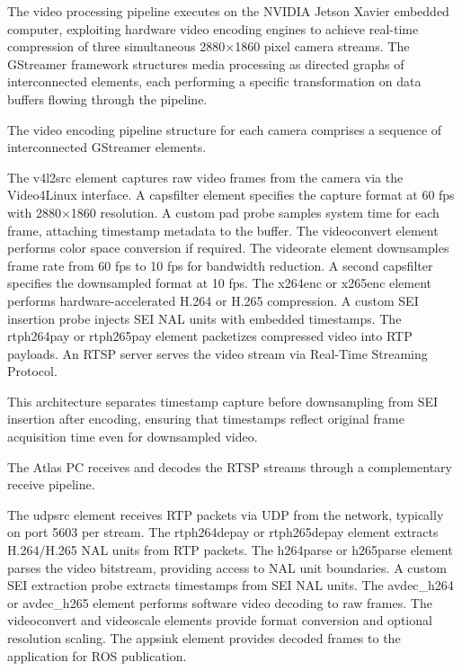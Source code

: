 \documentclass{erauthesis}
\begin{document}

The video processing pipeline executes on the NVIDIA Jetson Xavier embedded computer, exploiting hardware video encoding engines to achieve real-time compression of three simultaneous 2880×1860 pixel camera streams.
The GStreamer framework structures media processing as directed graphs of interconnected elements, each performing a specific transformation on data buffers flowing through the pipeline.


The video encoding pipeline structure for each camera comprises a sequence of interconnected GStreamer elements.

The v4l2src element captures raw video frames from the camera via the Video4Linux interface.
A capsfilter element specifies the capture format at 60 fps with 2880×1860 resolution.
A custom pad probe samples system time for each frame, attaching timestamp metadata to the buffer.
The videoconvert element performs color space conversion if required.
The videorate element downsamples frame rate from 60 fps to 10 fps for bandwidth reduction.
A second capsfilter specifies the downsampled format at 10 fps.
The x264enc or x265enc element performs hardware-accelerated H.264 or H.265 compression.
A custom SEI insertion probe injects SEI NAL units with embedded timestamps.
The rtph264pay or rtph265pay element packetizes compressed video into RTP payloads.
An RTSP server serves the video stream via Real-Time Streaming Protocol.

This architecture separates timestamp capture before downsampling from SEI insertion after encoding, ensuring that timestamps reflect original frame acquisition time even for downsampled video.


The Atlas PC receives and decodes the RTSP streams through a complementary receive pipeline.

The udpsrc element receives RTP packets via UDP from the network, typically on port 5603 per stream.
The rtph264depay or rtph265depay element extracts H.264/H.265 NAL units from RTP packets.
The h264parse or h265parse element parses the video bitstream, providing access to NAL unit boundaries.
A custom SEI extraction probe extracts timestamps from SEI NAL units.
The avdec\_h264 or avdec\_h265 element performs software video decoding to raw frames.
The videoconvert and videoscale elements provide format conversion and optional resolution scaling.
The appsink element provides decoded frames to the application for ROS publication.
\end{document}

